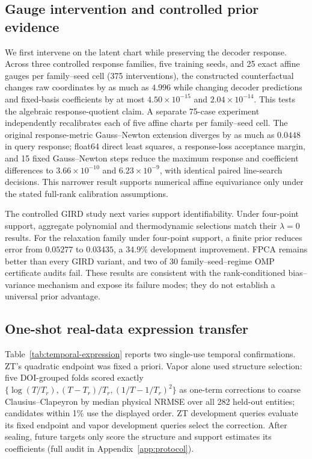 \subsection{Gauge intervention and controlled prior evidence}

We first intervene on the latent chart while preserving the decoder response.
Across three controlled response families, five training seeds, and 25 exact
affine gauges per family--seed cell (375 interventions), the constructed
counterfactual changes raw coordinates by as much as $4.996$ while changing
decoder predictions and fixed-basis coefficients by at most
$4.50\times10^{-15}$ and $2.04\times10^{-14}$.  This tests the algebraic
response-quotient claim.  A separate 75-case experiment independently
recalibrates each of five affine charts per family--seed cell.  The original
response-metric Gauss--Newton extension diverges by as
much as $0.0448$ in query response; float64 direct least squares, a response-loss
acceptance margin, and
15 fixed Gauss--Newton steps reduce the maximum response and coefficient
differences to $3.66\times10^{-10}$ and $6.23\times10^{-9}$, with identical
paired line-search decisions.  This narrower result supports numerical affine
equivariance only under the stated full-rank calibration assumptions.

The controlled GIRD study next varies support identifiability.  Under four-point
support, aggregate polynomial and thermodynamic selections match their
$\lambda=0$ results.
For the relaxation family under four-point support, a finite prior reduces error
from $0.05277$ to $0.03435$, a $34.9\%$ development improvement.  FPCA remains
better than every GIRD variant, and two of 30 family--seed--regime OMP
certificate audits fail.
These results are consistent with the rank-conditioned bias--variance mechanism
and expose its failure modes; they do not establish a universal prior
advantage.

\subsection{One-shot real-data expression transfer}

Table~\ref{tab:temporal-expression} reports two single-use temporal
confirmations.  ZT's quadratic endpoint was fixed a priori.  Vapor alone used
structure selection: five DOI-grouped folds scored exactly
$\{\log(T/T_r),(T-T_r)/T_r,(1/T-1/T_r)^2\}$ as one-term corrections to coarse
Clausius--Clapeyron by median physical NRMSE over all 282 held-out entities;
candidates within 1\% use the displayed order.  ZT development queries evaluate
its fixed endpoint and vapor development queries select the correction.  After
sealing, future targets only score the structure and support estimates its
coefficients (full audit in Appendix~\ref{app:protocol}).

